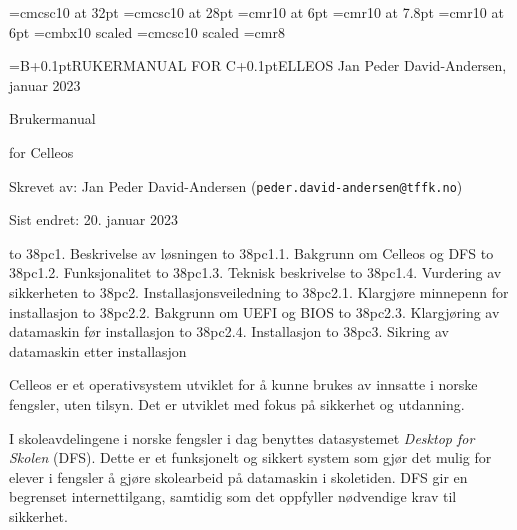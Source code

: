 



\font\ftitteltop=cmcsc10 at 32pt
\font\ftittelbottom=cmcsc10 at 28pt
\font\ftopptekst=cmr10 at 6pt
\font\ftopptekststor=cmr10 at 7.8pt
\font\fforfatter=cmr10 at 6pt
\font\fs=cmbx10 scaled
\font\fss=cmcsc10 scaled
\font\fc=cmr8

\def\imagewithcaption#1#2#3{
\centerline{
\vbox{\hbox{\epsfxsize #1 \epsffile{#2}}
\vskip 2pt
\hbox{\raise 4pt \vbox{\hsize=#1 \noindent \fc \baselineskip=9pt #3}}}}}

\headline={\ftopptekststor B\kern+0.1pt{\ftopptekst RUKERMANUAL FOR } C\kern+0.1pt{\ftopptekst ELLEOS \hfill Jan Peder David-Andersen, januar 2023}}

\topglue 6pc
\centerline{\ftitteltop Brukermanual}
\vskip 10pt
\centerline{\ftittelbottom for Celleos}
\vskip 8pc

\noindent Skrevet av: Jan Peder David-Andersen ({\tt peder.david-andersen@tffk.no})

\noindent Sist endret: 20. januar 2023

\vskip 3pc
\def\tocwidth{38pc}


\hbox to \tocwidth{1. Beskrivelse av l\o sningen }
\smallskip
\hbox to \tocwidth{1.1. Bakgrunn om Celleos og DFS }
\hbox to \tocwidth{1.2. Funksjonalitet }
\hbox to \tocwidth{1.3. Teknisk beskrivelse }
\hbox to \tocwidth{1.4. Vurdering av sikkerheten }
\medskip
\hbox to \tocwidth{2. Installasjonsveiledning }
\smallskip
\hbox to \tocwidth{2.1. Klargj\o re minnepenn for installasjon }
\hbox to \tocwidth{2.2. Bakgrunn om UEFI og BIOS }
\hbox to \tocwidth{2.3. Klargj\o ring av datamaskin f\o r installasjon }
\hbox to \tocwidth{2.4. Installasjon }
\medskip
\hbox to \tocwidth{3. Sikring av datamaskin etter installasjon }
\smallskip
\vfill\eject

\topglue 1pc

Celleos er et operativsystem utviklet for \aa{} kunne brukes av innsatte i norske fengsler, uten tilsyn. Det er utviklet med fokus p\aa{} sikkerhet og utdanning.



I skoleavdelingene i norske fengsler i dag benyttes datasystemet {\it Desktop for Skolen} (DFS). Dette er et funksjonelt og sikkert system som gj\o r det mulig for elever i fengsler \aa{} gj\o re skolearbeid p\aa{} datamaskin i skoletiden. DFS gir en begrenset internettilgang, samtidig som det oppfyller n\o dvendige krav til sikkerhet.

